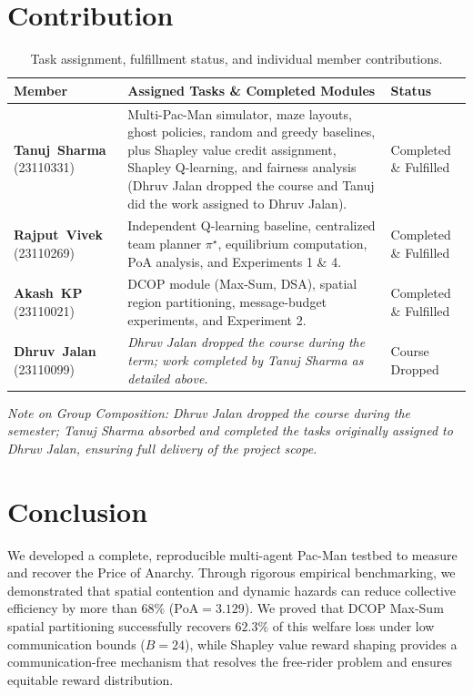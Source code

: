 \documentclass{article}
\newcommand{\PoA}{\mathrm{PoA}}
\begin{document}
\section{Contribution}

\begin{table}[H]
\centering
\small
\begin{tabular}{@{}L{3.4cm}L{7.8cm}L{3.0cm}@{}}
\toprule
\textbf{Member} & \textbf{Assigned Tasks \& Completed Modules} & \textbf{Status} \\
\midrule
\textbf{Tanuj~Sharma} (23110331) &
Multi-Pac-Man simulator, maze layouts, ghost policies, random and greedy baselines, plus Shapley value credit assignment, Shapley Q-learning, and fairness analysis (Dhruv Jalan dropped the course and Tanuj did the work assigned to Dhruv Jalan). & Completed \& Fulfilled \\
\addlinespace
\textbf{Rajput~Vivek} (23110269) &
Independent Q-learning baseline, centralized team planner $\pi^\star$, equilibrium computation, PoA analysis, and Experiments 1 \& 4. & Completed \& Fulfilled \\
\addlinespace
\textbf{Akash~KP} (23110021) &
DCOP module (Max-Sum, DSA), spatial region partitioning, message-budget experiments, and Experiment 2. & Completed \& Fulfilled \\
\addlinespace
\textbf{Dhruv~Jalan} (23110099) &
\textit{Dhruv Jalan dropped the course during the term; work completed by Tanuj Sharma as detailed above.} & Course Dropped \\
\bottomrule
\end{tabular}
\caption{Task assignment, fulfillment status, and individual member contributions.}
\label{tab:contributions}
\end{table}

\noindent\textit{Note on Group Composition: Dhruv Jalan dropped the course during the semester; Tanuj Sharma absorbed and completed the tasks originally assigned to Dhruv Jalan, ensuring full delivery of the project scope.}

\section{Conclusion}
We developed a complete, reproducible multi-agent Pac-Man testbed to measure and recover the Price of Anarchy. Through rigorous empirical benchmarking, we demonstrated that spatial contention and dynamic hazards can reduce collective efficiency by more than $68\%$ ($\PoA = 3.129$). We proved that DCOP Max-Sum spatial partitioning successfully recovers $62.3\%$ of this welfare loss under low communication bounds ($B=24$), while Shapley value reward shaping provides a communication-free mechanism that resolves the free-rider problem and ensures equitable reward distribution.
\end{document}
